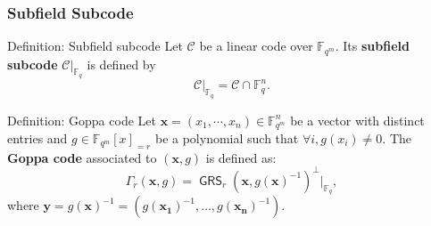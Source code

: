 \documentclass[
10pt, %
%
aspectratio=169, %
]{beamer}
\theoremstyle{plain}%
\theoremstyle{definition}
\theoremstyle{remark}
\newcommand{\calC}{\mathcal{C}}
\newcommand{\fqm}{\mathbb{F}_{q^m}}
\newcommand{\fq}{\mathbb{F}_{q}}
\newcommand{\GRS}{\operatorname{\mathsf{GRS}}}
\begin{document}
\begin{frame}
	\frametitle{Subfield Subcode}
	\begin{block}{Definition: Subfield subcode}
		Let $\calC$ be a linear code over $\fqm$.
		Its \textbf{subfield subcode} $\calC|_{\fq}$ is defined by 
		\[\calC|_{\fq}=\calC \cap \mathbb{F}_q^n.\]
	\end{block}
\begin{block}{Definition: Goppa code}
	Let $\mathbf{x}=(x_1,\cdots,x_n) \in \fqm^n$ be a vector with distinct entries and $g \in \fqm [x]_{=r}$ be a polynomial such that $\forall i, g(x_i)\neq 0$. The \textbf{Goppa code} associated to $(\mathbf{x}, g)$ is defined as: \[\Gamma_r(\mathbf{x},g)= \GRS_r(\mathbf{x},g(\mathbf{x})^{-1})^\perp|_{\fq},\]
	where $\mathbf{y} = g(\mathbf{x})^{-1}=(g(\mathbf{x_1})^{-1},\dots,g(\mathbf{x_n})^{-1})$.
\end{block}
\end{frame}
\end{document}
